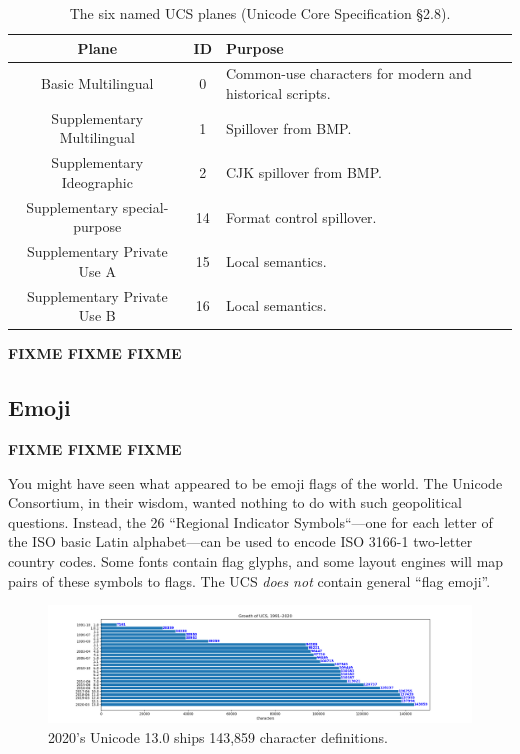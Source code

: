 \documentclass[letterpaper,10pt]{article}
\begin{document}
\begin{table}[h]
  \begin{center}
    \begin{tabular}{ |c|c|p{}| }
      \hline
      Plane & ID & Purpose \\
      \hline
      \hline
      Basic Multilingual & 0 & Common-use characters for modern and historical scripts. \\
      \hline
      Supplementary Multilingual & 1 & Spillover from BMP. \\
      \hline
      Supplementary Ideographic & 2 & CJK spillover from BMP. \\
      \hline
      Supplementary special-purpose & 14 & Format control spillover. \\
      \hline
      Supplementary Private Use A & 15 & Local semantics. \\
      \hline
      Supplementary Private Use B & 16 & Local semantics. \\
      \hline
    \end{tabular}
  \end{center}
  \caption[The six named UCS planes.]{The six named UCS planes (Unicode Core Specification §2.8\cite{unicode}).}
  \label{table:ucsplanes}
\end{table}

\textbf{FIXME FIXME FIXME}

\subsection{Emoji}
\textbf{FIXME FIXME FIXME}

You might have seen what appeared to be emoji flags of the world. The Unicode
Consortium, in their wisdom, wanted nothing to do with such geopolitical
questions. Instead, the 26 ``Regional Indicator Symbols``---one for each
letter of the ISO basic Latin alphabet\cite{iso646}---can be used to encode
ISO 3166-1\cite{iso3166} two-letter country codes\cite{darkcorners}. Some fonts contain flag
glyphs, and some layout engines will map pairs of these symbols to flags. The
UCS \textit{does not} contain general ``flag emoji''.

\begin{figure}
  \centering
  \includegraphics[width=1.1\linewidth]{media/unicode-growth.png}
  \caption{2020's Unicode 13.0 ships 143,859 character definitions.}
  \label{fig:unicodegrowth}
\end{figure}
\end{document}
